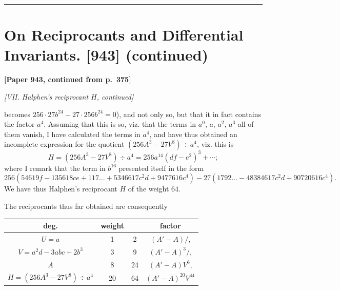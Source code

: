 \documentclass[11pt,a4paper]{book}
\begin{document}
\vspace{1cm}
\begin{center}
\rule{0.5\textwidth}{0.4pt}
\end{center}
\clearpage


\thispagestyle{empty}


\newpage

\section[On Reciprocants and Differential Invariants (continued)]
{On Reciprocants and Differential Invariants. [943] (continued)}

\noindent\textbf{[Paper 943, continued from p.~375]}

\bigskip

\noindent\textit{[VII. Halphen's reciprocant $H$, continued]}

\medskip

becomes $256 \cdot 27b^{24} - 27 \cdot 256b^{24} = 0$), and not only so, but that it in fact contains the factor $a^4$. Assuming that this is so, viz.
that the terms in $a^0$, $a$, $a^2$, $a^3$ all of them vanish, I have calculated the terms in $a^4$, and have thus obtained an incomplete expression for the quotient $(256A^3 - 27V^8) \div a^4$, viz.
this is
\[
H = (256A^3 - 27V^8) \div a^4 = 256a^{14}(df - e^2)^3 + \cdots ;
\]
where I remark that the term in $b^{16}$ presented itself in the form
\[
256(54619f - 135618ce + 117\dots + 5346617c^2d + 9477616c^4) - 27(1792\dots - 48384617c^2d + 90720616c^4).
\]
We have thus Halphen's reciprocant $H$ of the weight $64$.

The reciprocants thus far obtained are consequently
\begin{center}
\begin{tabular}{c|c|c|c}
deg. & weight & & factor \\ \hline
$U = a$ & 1 & 2 & $(A' - A)/$, \\
$V = a^2d - 3abc + 2b^3$ & 3 & 9 & $(A' - A)^3/$, \\
$A$ & 8 & 24 & $(A' - A)V^6$, \\
$H = (256A^3 - 27V^8) \div a^4$ & 20 & 64 & $(A' - A)^{20}V^{44}$
\end{tabular}
\end{center}
\end{document}
